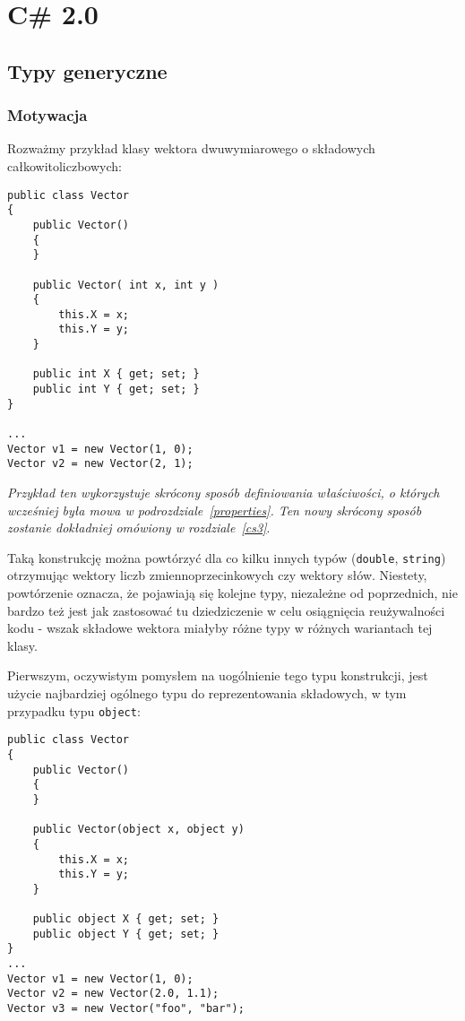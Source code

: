 ﻿\section{C\# 2.0}

\subsection{Typy generyczne}

\subsubsection{Motywacja}

Rozważmy przykład klasy wektora dwuwymiarowego o składowych całkowitoliczbowych:

\begin{scriptsize}
\begin{verbatim}
public class Vector
{
    public Vector()
    {
    }

    public Vector( int x, int y )
    {
        this.X = x;
        this.Y = y;
    }

    public int X { get; set; }
    public int Y { get; set; }
}

...
Vector v1 = new Vector(1, 0);
Vector v2 = new Vector(2, 1);
\end{verbatim}
\end{scriptsize}

{\em Przykład ten wykorzystuje skrócony sposób definiowania właściwości, o których wcześniej była mowa
w podrozdziale~\ref{properties}. Ten nowy skrócony sposób zostanie dokładniej omówiony w rozdziale~\ref{cs3}}. 

Taką konstrukcję można powtórzyć dla co kilku innych typów ({\tt double}, {\tt string}) otrzymując wektory liczb
zmiennoprzecinkowych czy wektory słów. Niestety, powtórzenie oznacza, że pojawiają się kolejne typy, niezależne od poprzednich,
nie bardzo też jest jak zastosować tu dziedziczenie w celu osiągnięcia reużywalności kodu - wszak składowe wektora miałyby
różne typy w różnych wariantach tej klasy.

Pierwszym, oczywistym pomysłem na uogólnienie tego typu konstrukcji, jest użycie najbardziej ogólnego typu do
reprezentowania składowych, w tym przypadku typu {\tt object}:

\begin{scriptsize}
\begin{verbatim}
public class Vector
{
    public Vector()
    {
    }

    public Vector(object x, object y)
    {
        this.X = x;
        this.Y = y;
    }

    public object X { get; set; }
    public object Y { get; set; }
}
...
Vector v1 = new Vector(1, 0);
Vector v2 = new Vector(2.0, 1.1);
Vector v3 = new Vector("foo", "bar");
\end{verbatim}
\end{scriptsize}

